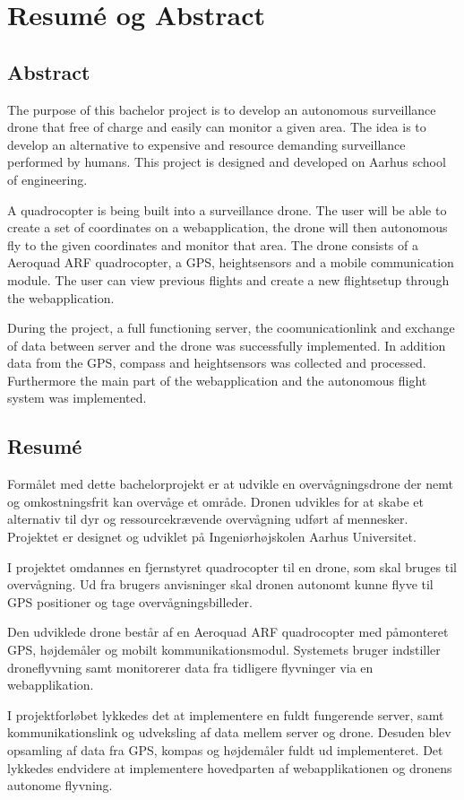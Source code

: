 \chapter{Resumé og Abstract}
\label{chap:resume}


\section*{Abstract}

The purpose of this bachelor project is to develop an autonomous surveillance drone that free of charge and easily can monitor a given area. The idea is to develop an alternative to expensive and resource demanding surveillance performed by humans. This project is designed and developed on Aarhus school of engineering. 

A quadrocopter is being built into a surveillance drone. The user will be able to create a set of coordinates on a webapplication, the drone will then autonomous fly to the given coordinates and monitor that area. 
The drone consists of a Aeroquad ARF quadrocopter, a GPS, heightsensors and a mobile communication module. 
The user can view previous flights and create a new flightsetup through the webapplication.

During the project, a full functioning server, the coomunicationlink and exchange of data between server and the drone was successfully implemented. In addition data from the GPS, compass and heightsensors was collected and processed. Furthermore the main part of the webapplication and the autonomous flight system was implemented.




\section*{Resumé}

Formålet med dette bachelorprojekt er at udvikle en overvågningsdrone der nemt og omkostningsfrit kan overvåge et område. Dronen udvikles for at skabe et alternativ til dyr og ressourcekrævende overvågning udført af mennesker.
Projektet er designet og udviklet på Ingeniørhøjskolen Aarhus Universitet.

I projektet omdannes en fjernstyret quadrocopter til en drone, som skal bruges til overvågning. Ud fra brugers anvisninger skal dronen autonomt kunne flyve til GPS positioner og tage overvågningsbilleder.  

Den udviklede drone består af en Aeroquad ARF quadrocopter med påmonteret GPS, højdemåler og mobilt kommunikationsmodul. Systemets bruger indstiller droneflyvning samt monitorerer data fra tidligere flyvninger via en webapplikation.  

I projektforløbet lykkedes det at implementere en fuldt fungerende server, samt kommunikationslink og udveksling af data mellem server og drone. Desuden blev opsamling af data fra GPS, kompas og højdemåler fuldt ud implementeret. Det lykkedes endvidere at implementere hovedparten af webapplikationen og dronens autonome flyvning.





